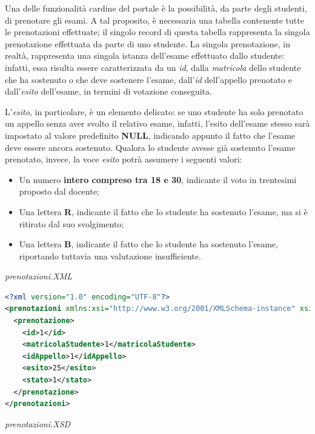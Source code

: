 \documentclass [a4paper,11pt]{book}
\begin{document}
\label{sec:esito}

Una delle funzionalità cardine del portale è la possibilità, da parte degli studenti, di prenotare gli esami. A tal proposito, è necessaria una tabella contenente tutte le prenotazioni effettuate; il singolo record di questa tabella rappresenta la singola prenotazione effettuata da parte di uno studente. La singola prenotazione, in realtà, rappresenta una singola istanza dell'esame effettuato dallo studente: infatti, essa risulta essere caratterizzata da un \emph{id}, dalla \emph{matricola} dello studente che ha sostenuto o che deve sostenere l'esame, dall'\emph{id} dell'appello prenotato e dall'\emph{esito} dell'esame, in termini di votazione conseguita.

L'\emph{esito}, in particolare, è un elemento delicato: se uno studente ha solo prenotato un appello senza aver svolto il relativo esame, infatti, l'esito dell'esame stesso sarà impostato al valore predefinito \textbf{NULL}, indicando appunto il fatto che l'esame deve essere ancora sostenuto. Qualora lo studente avesse già sostenuto l'esame prenotato, invece, la voce \emph{esito} potrà assumere i seguenti valori:
\begin{itemize}
\item Un numero \textbf{intero compreso tra 18 e 30}, indicante il voto in trentesimi proposto dal docente;
\item Una lettera \textbf{R}, indicante il fatto che lo studente ha sostenuto l'esame, ma si è ritirato dal suo svolgimento;
\item Una lettera \textbf{B}, indicante il fatto che lo studente ha sostenuto l'esame, riportando tuttavia una valutazione insufficiente.
\end{itemize}

\medskip

\emph{prenotazioni.XML}

\label{sec:prenotazioni}

\begin{lstlisting}[language=XML]
<?xml version="1.0" encoding="UTF-8"?>
<prenotazioni xmlns:xsi="http://www.w3.org/2001/XMLSchema-instance" xsi:noNamespaceSchemaLocation="prenotazione.xsd">
  <prenotazione>
    <id>1</id>
    <matricolaStudente>1</matricolaStudente>
    <idAppello>1</idAppello>
    <esito>25</esito>
    <stato>1</stato>
  </prenotazione>
</prenotazioni>
\end{lstlisting}

\emph{prenotazioni.XSD}
\end{document}
